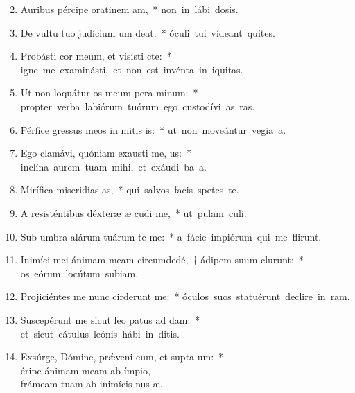 \begin{flushleft}
\begin{enumerate}[leftmargin=*]
\setcounter{enumi}{1}

\item Auribus pércipe oratinem am,~* \mbox{non in lábi dosis.}
\item De vultu tuo judícium um deat:~* \mbox{óculi tui vídeant quites.}
\item Probásti cor meum, et visisti cte:~* \mbox{igne me examinásti, et non est invénta in  iquitas.}
\item Ut non loquátur os meum pera minum:~* \mbox{propter verba labiórum tuórum ego custodívi as ras.}
\item Pérfice gressus meos in mitis is:~* \mbox{ut non moveántur vegia a.}
\item Ego clamávi, quóniam exausti me, us:~* \mbox{inclína aurem tuam mihi, et exáudi ba a.}
\item Mirífica miseridias as,~* \mbox{qui salvos facis spetes  te.}
\item A resisténtibus déxteræ æ cudi me,~* \mbox{ut pulam culi.}
\item Sub umbra alárum tuárum te me:~* \mbox{a fácie impiórum qui me flirunt.}
\item Inimíci mei ánimam meam circumdedé,~† ádipem suum clurunt:~* \mbox{os eórum locútum  subiam.}
\item Projiciéntes me nunc cirderunt me:~* \mbox{óculos suos statuérunt declire in ram.}
\item Suscepérunt me sicut leo patus ad dam:~* \mbox{et sicut cátulus leónis hábi in ditis.}
\item Exsúrge, Dómine, pr\'{\ae}veni eum, et supta um:~* \\éripe ánimam meam ab ímpio, \\frámeam tuam ab inimícis nus æ.

\end{enumerate}
\end{flushleft}

